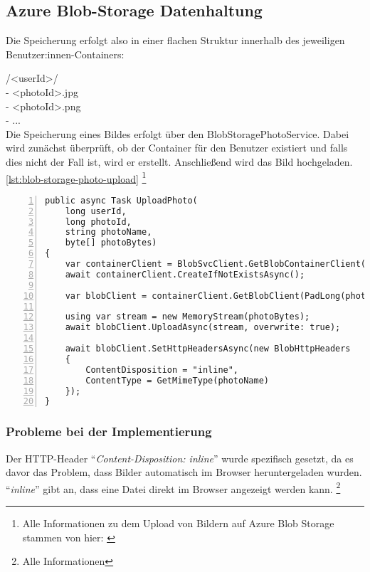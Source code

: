\subsection{Azure Blob-Storage Datenhaltung}
\label{subsection:azure_blob_storage_datamodel}

Die Speicherung erfolgt also in einer flachen Struktur innerhalb des 
jeweiligen Benutzer:innen-Containers:

/<userId>/\\
 - <photoId>.jpg\\
 - <photoId>.png\\
 - ...\\

Die Speicherung eines Bildes erfolgt über den BlobStoragePhotoService. 
Dabei wird zunächst überprüft, ob der Container für den Benutzer existiert und falls dies 
nicht der Fall ist, wird er erstellt. Anschließend wird das Bild hochgeladen.
\ref{lst:blob-storage-photo-upload}
\footnote{Alle Informationen zu dem Upload von Bildern auf Azure Blob Storage stammen von hier: \cite{MicrosoftCorporationac}}

\begin{lstlisting}[numbers=left,caption={Foto Upload auf den Blob-Storage},label={lst:blob-storage-photo-upload}]
public async Task UploadPhoto(
    long userId, 
    long photoId, 
    string photoName, 
    byte[] photoBytes)
{
    var containerClient = BlobSvcClient.GetBlobContainerClient(PadLong(userId));
    await containerClient.CreateIfNotExistsAsync();
    
    var blobClient = containerClient.GetBlobClient(PadLong(photoId) + GetExtension(photoName));
    
    using var stream = new MemoryStream(photoBytes);
    await blobClient.UploadAsync(stream, overwrite: true);
    
    await blobClient.SetHttpHeadersAsync(new BlobHttpHeaders
    {
        ContentDisposition = "inline",
        ContentType = GetMimeType(photoName)
    });
}    
\end{lstlisting}

\subsubsection{Probleme bei der Implementierung}

Der HTTP-Header ``\emph{Content-Disposition: inline}'' wurde spezifisch gesetzt,
da es davor das Problem, dass Bilder automatisch im Browser heruntergeladen wurden.
``\emph{inline}'' gibt an, dass eine Datei direkt im Browser angezeigt werden kann.
\footnote{Alle Informationen}

